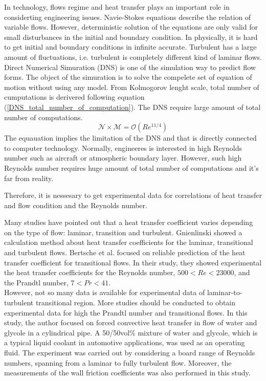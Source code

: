 \documentclass[conference]{IEEEtran}
\begin{document}
In technology, flows regime and heat transfer plays an important role in considerting engineering issues.
Navie-Stokes equations describe the relation of variable flows.
However, deterministic solution of the equations are only valid for small disturbances in the initial and boundary condition.
In physically, it is hard to get initial and boundary conditions in infinite accurate.
Turbulent has a large amount of fluctuations, i.e. turbulent is completely different kind of laminar flows.
Direct Numerical Simuration (DNS) is one of the simulation way to predict flow forms.
The object of the simuration is to solve the compelete set of equation of motion without using any model.
From Kolmogorov lenght scale, total number of cumputations is derivered following equation (\ref{DNS_total_number_of_computation}).
The DNS require large amount of total number of computations.
\begin{equation}
    \mathcal N \times \mathcal M= \mathcal O (Re^{11/4})
    \label{DNS_total_number_of_computation}
\end{equation}
The equauation implies the limitation of the DNS and that is directly connected to computer technology.
Normally, engineeres is interested in high Reynolds number such as aircraft or atmospheric boundary layer.
However, such high Reynolds number requires huge amount of total number of computations and it's far from reality.

Therefore, it is nessesary to get experimental data for correlations of heat transfer and flow condition and the Reynolds number.

Many studies have pointed out that a heat transfer coefficient varies depending on the type of flow: laminar, transition and turbulent.
Gnienlinski\cite{Gnienlinski2010} showed a calculation method about heat transfer coefficients for the laminar, transitional and turbulent flows.
Bertsche et al.\cite{Bertsche2016} focused on reliable prediction of the heat transfer coefficient for transitional flows.
In their study, they showed experimental the heat transfer coefficients for the Reynolds number, $500 < Re < 23000$, and the Prandtl number, $7 < Pr < 41$.\\
However, not so many data is available for experimental data of laminar-to-turbulent transitional region.
More studies should be conducted to obtain experimental data for high the Prandtl number and transitional flows.
In this study, the author focused on forced convective heat transfer in flow of water and glycole in a cylindrical pipe.
A 50/50vol\% mixture of water and glycole, which is a typical liquid coolant in automotive applications, was used as an operating fluid.
The experiment was carried out by considering a board range of Reynolds numbers, spanning from a laminar to fully turbulent flow.
Moreover, the measurements of the wall friction coefficients was also performed in this study.
\end{document}
